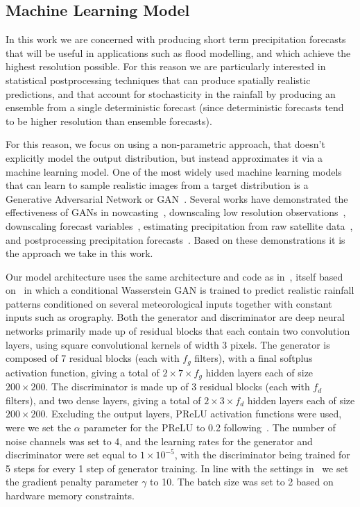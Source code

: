 \documentclass{article}
\begin{document}
\subsection{Machine Learning Model}


In this work we are concerned with producing short term precipitation forecasts that will be useful in applications such as flood modelling, and which achieve the highest resolution possible. For this reason we are particularly interested in statistical postprocessing techniques that can produce spatially realistic predictions, and that account for stochasticity in the rainfall by producing an ensemble from a single deterministic forecast (since deterministic forecasts tend to be higher resolution than ensemble forecasts).

For this reason, we focus on using a non-parametric approach, that doesn't explicitly model the output distribution, but instead approximates it via a machine learning model. One of the most widely used machine learning models that can learn to sample realistic images from a target distribution is a Generative Adversarial Network or GAN~\citep{}. Several works have demonstrated the effectiveness of GANs in nowcasting~\citep{ravuri_skilful_2021}, downscaling low resolution observations~\citep{leinonen_stochastic_2020}, downscaling forecast variables~\citep{harris_generative_2022, price_increasing_2022}, estimating precipitation from raw satellite data~\citep{hayatbini_conditional_2019}, and postprocessing precipitation forecasts~\citep{duncan_generative_2022, jeong_correcting_2023,  hess_physically_2022, yang_improving_2023}. Based on these demonstrations it is the approach we take in this work. 

Our model architecture uses the same architecture and code as in~\cite{harris_generative_2022}, itself based on~\cite{leinonen_stochastic_2020} in which a conditional Wasserstein GAN is trained to predict realistic rainfall patterns conditioned on several meteorological inputs together with constant inputs such as orography. Both the generator and discriminator are deep neural networks primarily made up of residual blocks that each contain two convolution layers, using square convolutional kernels of width 3 pixels. The generator is composed of 7 residual blocks (each with $f_g$ filters), with a final softplus activation function, giving a total of $2 \times 7 \times f_g$ hidden layers each of size $200 \times 200$. The discriminator is made up of 3 residual blocks (each with $f_d$ filters), and two dense layers, giving a total of $2 \times 3 \times f_d$ hidden layers each of size $200 \times 200$. 
Excluding the output layers, PReLU activation functions were used, were we set the $\alpha$ parameter for the PReLU to 0.2 following~\cite{harris_generative_2022}. The number of noise channels was set to 4, and the learning rates for the generator and discriminator were set equal to $1\times 10^{-5}$, with the discriminator being trained for 5 steps for every 1 step of generator training. In line with the settings in~\cite{gulrajani_improved_2017} we set the gradient penalty parameter $\gamma$ to 10. The batch size was set to 2 based on hardware memory constraints.
\end{document}

